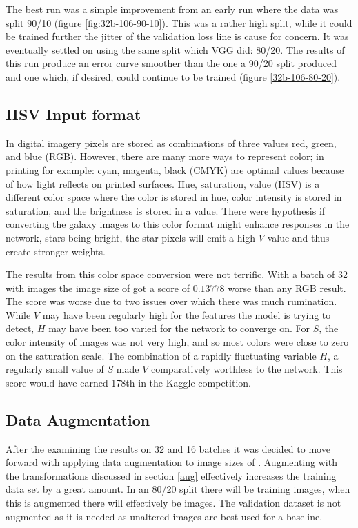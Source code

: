 The best run was a simple improvement from an early run where the data was split 90/10 (figure \ref{fig:32b-106-90-10}). This was a rather high split, while it could be trained further the jitter of the validation loss line is cause for concern. It was eventually settled on using the same split which VGG did: 80/20. The results of this run produce an error curve smoother than the one a 90/20 split produced and one which, if desired, could continue to be trained (figure \ref{32b-106-80-20}).

\subsection{HSV Input format}

In digital imagery pixels are stored as combinations of three values red, green, and blue (RGB). However, there are many more ways to represent color; in printing for example: cyan, magenta, black (CMYK) are optimal values because of how light reflects on printed surfaces. Hue, saturation, value (HSV) is a different color space where the color is stored in hue, color intensity is stored in saturation, and the brightness is stored in a value. There were hypothesis if converting the galaxy images to this color format might enhance responses in the network, stars being bright, the star pixels will emit a high $V$ value and thus create stronger weights.

The results from this color space conversion were not terrific. With a batch of 32 with images the image size of  got a score of $0.13778$ worse than any RGB result. The score was worse due to two issues over which there was much rumination. While $V$ may have been regularly high for the features the model is trying to detect, $H$ may have been too varied for the network to converge on. For $S$, the color intensity of images was not very high, and so most colors were close to zero on the saturation scale. The combination of a rapidly fluctuating variable $H$, a regularly small value of $S$ made $V$ comparatively worthless to the network. This score would have earned 178th in the Kaggle competition.

\subsection{Data Augmentation}
After the examining the results on 32 and 16 batches it was decided to move forward with applying data augmentation to image sizes of . Augmenting with the transformations discussed in section \ref{aug} effectively increases the training data set by a great amount. In an 80/20 split there will be  training images, when this is augmented there will effectively be  images. The validation dataset is not augmented as it is needed as unaltered images are best used for a baseline.

